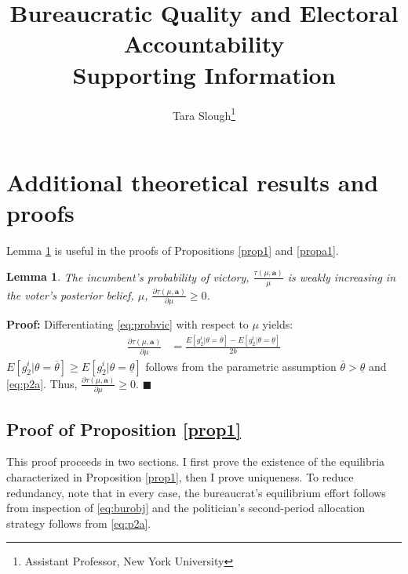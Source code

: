\documentclass[11pt,english]{article}
\newtheorem{lemma}{Lemma}
\begin{document}
\title{Bureaucratic Quality and Electoral Accountability\\\Large{Supporting Information}}


\author{Tara Slough\footnote{Assistant Professor, New York University} 
}
\maketitle




\tableofcontents
\clearpage
    \setcounter{lemma}{0}
    \renewcommand{\thelemma}{\Alph{section}\arabic{lemma}}

     \setcounter{prop}{0}
    \renewcommand{\theprop}{\Alph{section}\arabic{prop}}

\section{Additional theoretical results and proofs}
Lemma \ref{lemma1} is useful in the proofs of Propositions \ref{prop1} and \ref{propa1}. 

\begin{lemma}\label{lemma1} The incumbent's probability of victory, $\frac{\tau(\mu, \boldsymbol{a})}{\mu}$ is weakly increasing in the voter's posterior belief, $\mu$, $\frac{\partial \tau(\mu, \boldsymbol{a})}{\partial \mu}\geq 0$.
\end{lemma}
\textbf{Proof:} Differentiating \eqref{eq:probvic} with respect to $\mu$ yields:
\begin{align*}
\frac{\partial \tau(\mu, \boldsymbol{a})}{\partial \mu}&= \frac{E[g_2^i|\theta  = \overline{\theta}]-E[g_2^i|\theta = \underline{\theta}]}{2b}
\end{align*}
$E[g_2^i|\theta = \overline{\theta}] \geq E[g_2^i|\theta = \underline{\theta}]$ follows from the parametric assumption $\overline{\theta}>\underline{\theta}$ and \eqref{eq:p2a}. Thus, $\frac{\partial \tau(\mu, \boldsymbol{a})}{\partial \mu} \geq 0$. $\blacksquare$\\


\subsection{Proof of Proposition \ref{prop1}}

This proof proceeds in two sections. I first prove the existence of the equilibria characterized in Proposition \ref{prop1}, then I prove uniqueness. To reduce redundancy, note that in every case, the bureaucrat's equilibrium effort follows from inspection of \eqref{eq:burobj} and the politician's second-period allocation strategy follows from \eqref{eq:p2a}.\\
\end{document}
